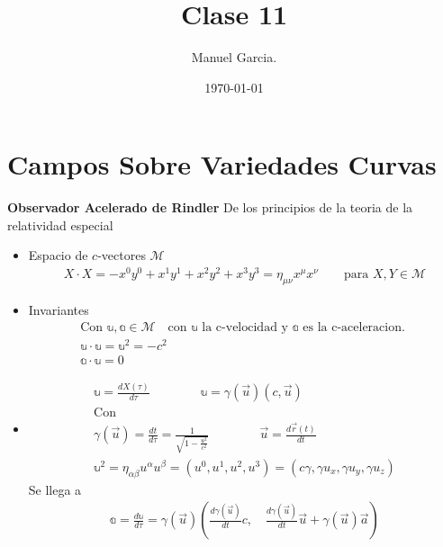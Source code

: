 \documentclass{article}
\title{Clase 11}
\author{Manuel Garcia.}
\date{\today}
\newcommand{\caja}[3]{%
  \begin{tcolorbox}[colback=#1!5!white,colframe=#1!25!black,title=#2]
    #3
  \end{tcolorbox}%
}
\begin{document}
\maketitle

\section{Campos Sobre Variedades Curvas }

\caja{black}{Apéndice A }{
  \textbf{Observador Acelerado de Rindler }
  De los principios de la teoria de la relatividad especial 
  \begin{itemize}
    \item Espacio de $ c $-vectores $ \mathcal M  $
      \begin{gather*}
        X \cdot X = - x ^ {0 } y ^ {0 } + x ^ {1 } y ^ {1 } + x ^ {2 }y ^ {2 } + x ^ {3 } y ^ {3 } =\eta _{\mu\nu} x ^ {\mu} x ^ {\nu} \qquad \text{para } X , Y \in \mathcal M   
      \end{gather*}
    \item Invariantes 
      \begin{gather*}
        \text{Con }\mathbb u, \mathbb a \in \mathcal M \quad \text{con } \mathbb u \text{ la c-velocidad y }\mathbb a \text{ es la c-aceleracion. }\\
        \mathbb u\cdot \mathbb u = \mathbb u ^ {2 } = - c ^ {2 } \\
        \mathbb a \cdot \mathbb u = 0 
      \end{gather*}
    \item 
      \begin{gather*}
        \mathbb u = \frac{d X(\tau ) }{d \tau } \qquad \qquad \mathbb u = \gamma(\vec u ) (c, \vec u ) \\
        \text{Con }\\
        \gamma(\vec u )= \frac{d t  }{d  \tau} = \frac{1}{\sqrt{1 - \frac{u ^2}{c ^2}} } \qquad \qquad \vec u = \frac{d \vec r (t) }{d t } \\
        \mathbb u ^ {2 } = \eta _{\alpha\beta} u ^ {\alpha} u ^ {\beta} = (u ^ {0 }, u ^ {1 }, u ^ {2 }, u ^ {3 }) = (c\gamma, \gamma u_x, \gamma u_y, \gamma u_z)
      \end{gather*}
      Se llega a 
      \begin{gather*}
        \mathbb a = \frac{d \mathbb u  }{d \tau} = \gamma(\vec u ) \left(\frac{d \gamma(\vec u ) }{d t} c , \quad \frac{d \gamma(\vec u ) }{d t } \vec u + \gamma(\vec u ) \vec a \right) 
      \end{gather*}
  \end{itemize}
}
\end{document}

